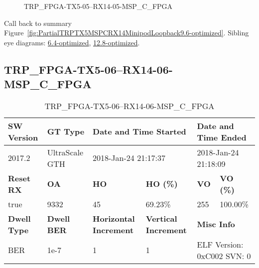 \begin{figure}[h]
\caption{TRP\_FPGA-TX5-05--RX14-05-MSP\_C\_FPGA} \label{fig:TRPFPGATX505RX1405MSPCFPGA9.6-optimized}
\end{figure}

Call back to summary Figure~\ref{fig:PartialTRPTX5MSPCRX14MinipodLoopback9.6-optimized}.
Sibling eye diagrams: \hyperref[sec:TRPFPGATX505RX1405MSPCFPGA6.4-optimized]{6.4-optimized}, \hyperref[sec:TRPFPGATX505RX1405MSPCFPGA12.8-optimized]{12.8-optimized}.

\clearpage
\newpage


\subsection{TRP\_FPGA-TX5-06--RX14-06-MSP\_C\_FPGA}\label{sec:TRPFPGATX506RX1406MSPCFPGA9.6-optimized}

\begin{table}[h]
\centering
\caption{TRP\_FPGA-TX5-06--RX14-06-MSP\_C\_FPGA}
\label{tab:TRPFPGATX506RX1406MSPCFPGA9.6-optimized}
\begin{tabular}{@{}|l|l|l|l|l|l|@{}}
\toprule
\textbf{SW Version}                & \textbf{GT Type}   & \multicolumn{2}{l|}{\textbf{Date and Time Started}}            & \multicolumn{2}{l|}{\textbf{Date and Time Ended}}        \\ \midrule
2017.2                       & UltraScale GTH          & \multicolumn{2}{l|}{2018-Jan-24 21:17:37}                   & \multicolumn{2}{l|}{2018-Jan-24 21:18:09}               \\ \midrule
\textbf{Reset RX}                  & \textbf{OA} & \textbf{HO}   & \textbf{HO (\%)} & \textbf{VO} & \textbf{VO (\%)} \\ \midrule
true & 9332        & 45          & 69.23\%        & 255        & 100.00\%       \\ \midrule
\textbf{Dwell Type}                & \textbf{Dwell BER} & \textbf{Horizontal Increment} & \textbf{Vertical Increment}    & \multicolumn{2}{l|}{\textbf{Misc Info}}                  \\ \midrule
BER                            & 1e-7        & 1        & 1           & \multicolumn{2}{l|}{ELF Version: 0xC002 SVN: 0}                         \\ \bottomrule
\end{tabular}
\end{table}


